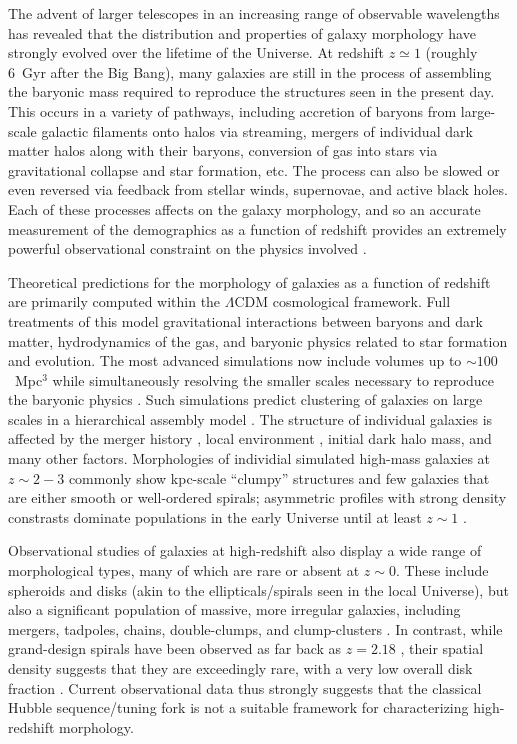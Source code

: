 \documentclass[twocolumn]{aastex6}
\begin{document}
The advent of larger telescopes in an increasing range of observable wavelengths has revealed that the distribution and properties of galaxy morphology have strongly evolved over the lifetime of the Universe. At redshift $z\simeq1$ (roughly 6~Gyr after the Big Bang), many galaxies are still in the process of assembling the baryonic mass required to reproduce the structures seen in the present day. This occurs in a variety of pathways, including accretion of baryons from large-scale galactic filaments onto halos via streaming, mergers of individual dark matter halos along with their baryons, conversion of gas into stars via gravitational collapse and star formation, etc. The process can also be slowed or even reversed via feedback from stellar winds, supernovae, and active black holes. Each of these processes affects on the galaxy morphology, and so an accurate measurement of the demographics as a function of redshift provides an extremely powerful observational constraint on the physics involved \citep[for a recent review see][]{con14}. 

Theoretical predictions for the morphology of galaxies as a function of redshift are primarily computed within the $\Lambda$CDM cosmological framework. Full treatments of this model gravitational interactions between baryons and dark matter, hydrodynamics of the gas, and baryonic physics related to star formation and evolution. The most advanced simulations now include volumes up to $\sim100$~Mpc$^3$ while simultaneously resolving the smaller scales necessary to reproduce the baryonic physics \citep{vog14a,sch15}. Such simulations predict clustering of galaxies on large scales in a hierarchical assembly model \citep{sil12}. The structure of individual galaxies is affected by the merger history \citep{too72,hop10}, local environment \citep[such as the morphology-density relation;][]{dre80}, initial dark halo mass, and many other factors. Morphologies of individial simulated high-mass galaxies at $z\sim2-3$ commonly show kpc-scale ``clumpy'' structures and few galaxies that are either smooth or well-ordered spirals; asymmetric profiles with strong density constrasts dominate populations in the early Universe until at least $z\sim1$ \citep{gen14}. 

Observational studies of galaxies at high-redshift also display a wide range of morphological types, many of which are rare or absent at $z\sim0$. These include spheroids and disks (akin to the ellipticals/spirals seen in the local Universe), but also a significant population of massive, more irregular galaxies, including mergers, tadpoles, chains, double-clumps, and clump-clusters \citep{elm05,elm07,cam11a,for11a,kar15}. In contrast, while grand-design spirals have been observed as far back as $z=2.18$ \citep{law12}, their spatial density suggests that they are exceedingly rare, with a very low overall disk fraction \citep{mor13}. Current observational data thus strongly suggests that the classical Hubble sequence/tuning fork \citep{hub36} is not a suitable framework for characterizing high-redshift morphology. 
\end{document}
